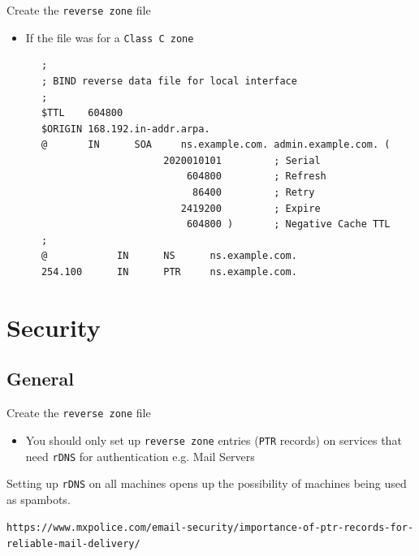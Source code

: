 \documentclass[xcolor=table]{beamer}
\begin{document}
\begin{frame}[fragile]{Create the \texttt{reverse zone} file}
  \begin{itemize}
    \item If the file was for a \texttt{Class C zone}
  \end{itemize}
  \begin{tcolorbox}
    \lstset{
      basicstyle=\tiny\ttfamily,
    }
    \begin{lstlisting}
      ;
      ; BIND reverse data file for local interface
      ;
      $TTL    604800
      $ORIGIN 168.192.in-addr.arpa.
      @       IN      SOA     ns.example.com. admin.example.com. (
                           2020010101         ; Serial
                               604800         ; Refresh
                                86400         ; Retry
                              2419200         ; Expire
                               604800 )       ; Negative Cache TTL
      ;
      @            IN      NS      ns.example.com.
      254.100      IN      PTR     ns.example.com.
          \end{lstlisting}
  \end{tcolorbox}
\end{frame}

\section{Security}
\subsection{General}
\begin{frame}{Create the \texttt{reverse zone} file}
  \begin{itemize}
    \item You should only set up \texttt{reverse zone} entries (\texttt{PTR} records) on services that need \texttt{rDNS} for authentication e.g. Mail Servers
  \end{itemize}
  \begin{tcolorbox}[title={\textbf{NOTE:}}]
       \scriptsize Setting up \texttt{rDNS} on all machines opens up the possibility of machines being used as spambots.
  \end{tcolorbox}
  \tiny{\texttt{https://www.mxpolice.com/email-security/importance-of-ptr-records-for-reliable-mail-delivery/}}
\end{frame}
\end{document}
